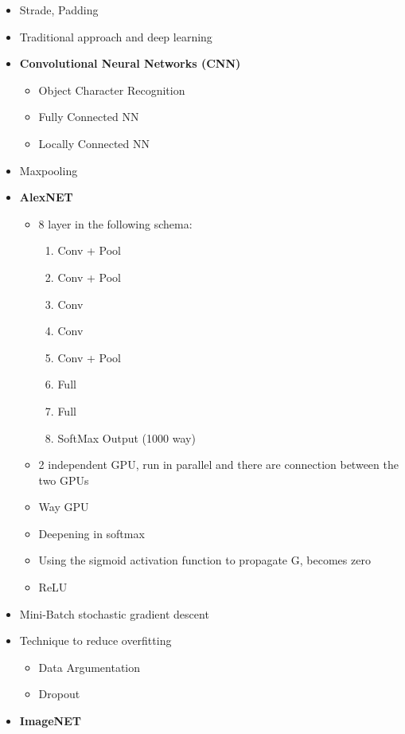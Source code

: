 \begin{itemize}
    \item Strade, Padding
    \item Traditional approach and deep learning
    \item \textbf{Convolutional Neural Networks (CNN)}
    \begin{itemize}
        \item Object Character Recognition
        \item Fully Connected NN
        \item Locally Connected NN
    \end{itemize}
    \item Maxpooling
    \item \textbf{AlexNET}
    \begin{itemize}
        \item 8 layer in the following schema:
        \begin{enumerate}
            \item Conv + Pool
            \item Conv + Pool
            \item Conv
            \item Conv
            \item Conv + Pool
            \item Full
            \item Full
            \item SoftMax Output (1000 way)
        \end{enumerate}
        \item 2 independent GPU, run in parallel and there are connection between the two GPUs
        \item Way GPU
        \item Deepening in softmax
        \item Using the sigmoid activation function to propagate G, becomes zero
        \item ReLU
    \end{itemize}
    \item Mini-Batch stochastic gradient descent
    \item Technique to reduce overfitting
    \begin{itemize}
        \item Data Argumentation
        \item Dropout
    \end{itemize}
    \item \textbf{ImageNET}
    \begin{itemize}

\end{itemize}
\end{itemize}

